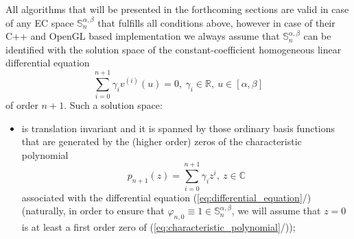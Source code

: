 \documentclass[b5paper, twosided]{book}
\DeclareRobustCommand{\mref}[1]{\ref{#1}{\relsize{-1}/\pageref{#1}}}
\begin{document}
All algorithms that will be presented in the forthcoming sections are valid in case of any EC space $\mathbb{S}_n^{\alpha, \beta}$ that fulfills all conditions above, however in case of their C++ and OpenGL based implementation we always assume that $\mathbb{S}_n^{\alpha, \beta}$ can be identified with the solution space of the constant-coefficient homogeneous linear differential equation
\begin{equation}
    \sum_{i=0}^{n+1}\gamma_{i}v^{\left(  i\right)  }\left(  u\right)=0,~\gamma_{i}\in\mathbb{R},~u\in\left[  \alpha,\beta\right]  
    \label{eq:differential_equation}
\end{equation} 
of order $n+1$. Such a solution space:
\begin{itemize}
    \item 
    is translation invariant and it is spanned by those ordinary basis functions that are generated by the (higher order) zeros of the characteristic polynomial
    \begin{equation}
        p_{n+1}\left(  z\right) =\sum_{i=0}^{n+1}\gamma_{i}z^{i},~z\in \mathbb{C}
        \label{eq:characteristic_polynomial}%
    \end{equation}
    associated with the differential equation (\mref{eq:differential_equation}) (naturally, in order to ensure that $\varphi_{n,0}\equiv 1 \in \mathbb{S}_n^{\alpha,\beta}$, we will assume that $z=0$ is at least a first order zero of (\mref{eq:characteristic_polynomial}));
    

\end{itemize}
\end{document}
